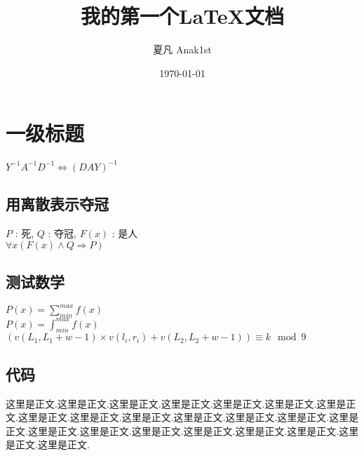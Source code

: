 \documentclass[12pt, a4paper, oneside]{article}
\title{我的第一个\LaTeX 文档}
\author{夏凡 Anak1st}
\date{\today}
\begin{document}
\maketitle

\section{一级标题}

$ Y^{-1} A^{-1} D^{-1} \iff (DAY)^{-1} $

\subsection{用离散表示夺冠}
\begin{center}
    $P$ : 死, $Q$ : 夺冠, $F(x)$ : 是人 \\
    ${\forall}x(F(x) \wedge Q \Rightarrow P)$
\end{center}

\subsection{测试数学}
\begin{center}
    $P(x)=\sum_{min}^{max}f(x)$ \\
    $P(x)=\int_{min}^{max}f(x)$ \\
    $(v(L_1, L_1 + w - 1) \times v(l_i, r_i) + v(L_2, L_2 + w - 1)) \equiv k \mod 9$
\end{center}

\newpage
\subsection{代码}


这里是正文.这里是正文.这里是正文.这里是正文.这里是正文.这里是正文.这里是正文.这里是正文.这里是正文.这里是正文.这里是正文.这里是正文.这里是正文.这里是正文.这里是正文.这里是正文.这里是正文.这里是正文.这里是正文.这里是正文.这里是正文.这里是正文.
\end{document}

